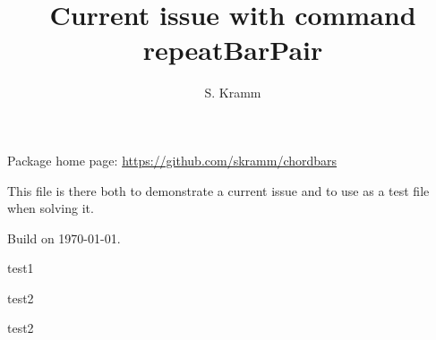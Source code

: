 \documentclass[12pt]{article}
\title{Current issue with command repeatBarPair}
\author{S. Kramm}
\begin{document}
\countbarsNo

\songtitle

Package home page: \url{https://github.com/skramm/chordbars}

This file is there both to demonstrate a current issue and to use as a test file when solving it.


Build on \today.

\def\barsize{1.5}%

\def\chordFontSize{\large\bfseries}

\begin{chordbar}{6}{test1}
\repeatBarPair
\end{chordbar}

\begin{chordbar}{6}{test2}
\repeatBarPair
{}
\end{chordbar}

\def\NumberOfBarsPerLine{8}
\begin{chordbar}{6}{test2}
\repeatBarPair
{}
\end{chordbar}
\end{document}
